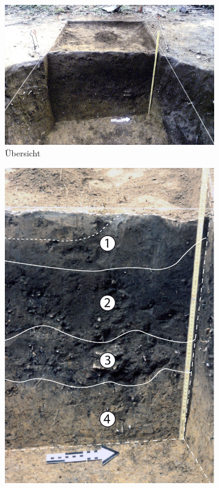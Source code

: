 \begin{figure}[!tb]
	\centering
	\begin{subfigure}[b]{.675\textwidth}
		\includegraphics[width = \textwidth]{fig/BBS87-1_H87-01-4.jpg}
		\caption{Übersicht}
		\label{fig:BBS87-1_ProfilOst_Foto_Übersicht}
	\end{subfigure}\hfill
	\begin{subfigure}[b]{.30\textwidth}
		\includegraphics[width = \textwidth]{fig/BBS87-1_H87-01-2.pdf}

\end{subfigure}
\end{figure}
